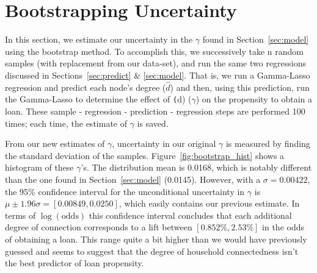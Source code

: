 \documentclass[11pt, fleqn]{article}
\begin{document}
\section{Bootstrapping Uncertainty}

In this section, we estimate our uncertainty in the $\gamma$ found in Section~\ref{sec:model} using the bootstrap method.  To accomplish this, we successively take n random samples (with replacement from our data-set), and run the same two regressions discussed in Sections~\ref{sec:predict} \& \ref{sec:model}.  That is, we run a Gamma-Lasso regression and predict each node's degree ($\hat{d}$) and then, using this prediction, run the Gamma-Lasso to determine the effect of \texttt(d) ($\gamma$) on the propensity to obtain a loan.  These sample - regression - prediction - regression steps are performed 100 times; each time, the estimate of $\gamma$ is saved.

From our new estimates of $\gamma$, uncertainty in our original $\gamma$ is measured by finding the standard deviation of the samples.  Figure~\ref{fig:bootstrap_hist} shows a histogram of these $\gamma$'s.  The distribution mean is 0.0168, which is notably different than the one found in Section~\ref{sec:model} (0.0145).  However, with a $\sigma = 0.00422$, the 95\% confidence interval for the unconditional uncertainty in $\gamma$ is $\mu \pm 1.96\sigma = \left[0.00849, 0.0250\right]$, which easily contains our previous estimate.  In terms of $\log(\text{odds})$ this confidence interval concludes that each additional degree of connection corresponds to a lift between $\left[0.852\%, 2.53\%\right]$ in the odds of obtaining a loan.  This range quite a bit higher than we would have previously guessed and seems to suggest that the degree of household connectedness isn't the best predictor of loan propensity.

\end{document}
